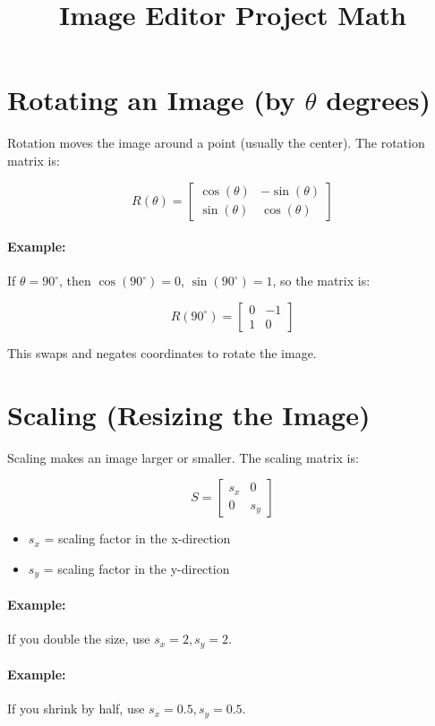 \documentclass{article}
\title{Image Editor Project Math}
\author{}
\date{}
\begin{document}
\maketitle

\section{Rotating an Image (by \(\theta\) degrees)}
Rotation moves the image around a point (usually the center). The rotation matrix is:

\[
R(\theta) = \begin{bmatrix}
\cos(\theta) & -\sin(\theta) \\
\sin(\theta) & \cos(\theta)
\end{bmatrix}
\]

\paragraph{Example:} If \(\theta = 90^\circ\), then \(\cos(90^\circ) = 0\), \(\sin(90^\circ) = 1\), so the matrix is:

\[
R(90^\circ) = \begin{bmatrix}
0 & -1 \\
1 & 0
\end{bmatrix}
\]

This swaps and negates coordinates to rotate the image.

\section{Scaling (Resizing the Image)}
Scaling makes an image larger or smaller. The scaling matrix is:

\[
S = \begin{bmatrix}
s_x & 0 \\
0 & s_y
\end{bmatrix}
\]

\begin{itemize}
    \item \(s_x\) = scaling factor in the x-direction
    \item \(s_y\) = scaling factor in the y-direction
\end{itemize}

\paragraph{Example:} If you double the size, use \(s_x = 2, s_y = 2\).

\paragraph{Example:} If you shrink by half, use \(s_x = 0.5, s_y = 0.5\).
\end{document}
